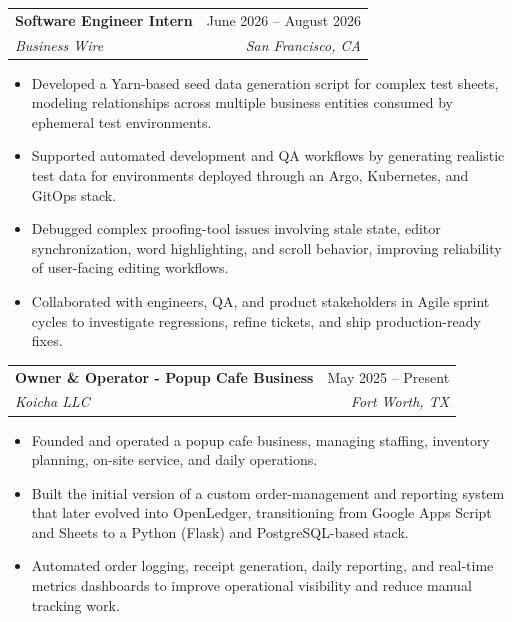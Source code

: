 \documentclass[letterpaper,11pt]{article}
\makeatletter
\newcommand{\resumeItem}[1]{
  \item\small{
    {#1 \vspace{-2pt}}
  }
}
\newcommand{\resumeSubheading}[4]{
  \vspace{-2pt}\item
    \begin{tabular*}{0.97\textwidth}[t]{l@{\extracolsep{\fill}}r}
      \textbf{#1} & #2 \\
      \textit{\small#3} & \textit{\small #4} \\
    \end{tabular*}\vspace{-7pt}
}
\newcommand{\resumeSubSubheading}[2]{
    \item
    \begin{tabular*}{0.97\textwidth}{l@{\extracolsep{\fill}}r}
      \textit{\small#1} & \textit{\small #2} \\
    \end{tabular*}\vspace{-7pt}
}
\newcommand{\resumeSubHeadingListEnd}{\end{itemize}}
\newcommand{\resumeItemListStart}{\begin{itemize}}
\newcommand{\resumeItemListEnd}{\end{itemize}\vspace{-5pt}}
\makeatother
\begin{document}

      

    \resumeSubheading
      {Software Engineer Intern}{June 2026 -- August 2026}
      {Business Wire}{San Francisco, CA}
      \resumeItemListStart
        \resumeItem{Developed a Yarn-based seed data generation script for complex test sheets, modeling relationships across multiple business entities consumed by ephemeral test environments.}
        \resumeItem{Supported automated development and QA workflows by generating realistic test data for environments deployed through an Argo, Kubernetes, and GitOps stack.}
        \resumeItem{Debugged complex proofing-tool issues involving stale state, editor synchronization, word highlighting, and scroll behavior, improving reliability of user-facing editing workflows.}
        \resumeItem{Collaborated with engineers, QA, and product stakeholders in Agile sprint cycles to investigate regressions, refine tickets, and ship production-ready fixes.}
      \resumeItemListEnd
      

    \resumeSubheading
      {Owner \& Operator - Popup Cafe Business}{May 2025 -- Present}
      {Koicha LLC}{Fort Worth, TX}
      \resumeItemListStart
        \resumeItem{Founded and operated a popup cafe business, managing staffing, inventory planning, on-site service, and daily operations.}
        \resumeItem{Built the initial version of a custom order-management and reporting system that later evolved into OpenLedger, transitioning from Google Apps Script and Sheets to a Python (Flask) and PostgreSQL-based stack.}
        \resumeItem{Automated order logging, receipt generation, daily reporting, and real-time metrics dashboards to improve operational visibility and reduce manual tracking work.}
    \resumeItemListEnd
\end{document}

